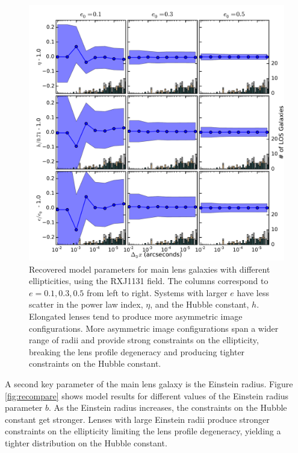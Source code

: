 \documentclass{emulateapj}
\begin{document}
\begin{figure}
\begin{center}
\includegraphics[width=1\textwidth]{ecompare.pdf}
\caption{\label{fig:ecompare} Recovered model parameters for main lens galaxies with different ellipticities, using the RXJ1131 field. The columns correspond to $e = 0.1,0.3,0.5$ from left to right. Systems with larger $e$ have less scatter in the power law index, $\eta$, and the Hubble constant, $h$. Elongated lenses tend to produce more asymmetric image configurations. More asymmetric image configurations span a wider range of radii and provide strong constraints on the ellipticity, breaking the lens profile degeneracy and producing tighter constraints on the Hubble constant.%
}
\end{center}
\end{figure}

A second key parameter of the main lens galaxy is the Einstein radius. Figure \ref{fig:recompare} shows model results for different values of the Einstein radius parameter $b$.  As the Einstein radius increases, the constraints on the Hubble constant get stronger. Lenses with large Einstein radii produce stronger constraints on the ellipticity limiting the lens profile degeneracy, yielding a tighter distribution on the Hubble constant.
\end{document}
